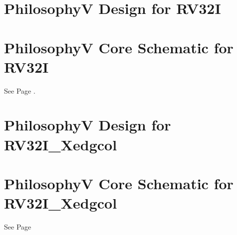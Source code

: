 
\section{PhilosophyV Design for RV32I}

\section{PhilosophyV Core Schematic for RV32I}
\label{section:philv_appendix_rv32i_core}
See Page \pageref{fig:philv-core}.

\section{PhilosophyV Design for RV32I\_Xedgcol}

\section{PhilosophyV Core Schematic for RV32I\_Xedgcol}
\label{section:philv_appendix_rv32i_xedgcol_core}
See Page %

\newpage
 
\thispagestyle{empty}
\newpage



\newpage
 
\thispagestyle{empty}
\newpage